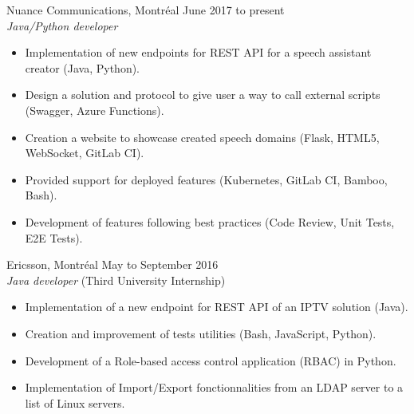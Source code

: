 \documentclass{res}
\newcommand{\inEnglish}[1]{#1}
\begin{document}
\begin{resume}
{	%

}

\inEnglish{
	Nuance Communications, Montréal\footnotemark
	\hfill June 2017 to present \\
	{\sl Java/Python developer}
	\vspace{0.05in}

	\begin{itemize} \itemsep -2pt
		\item Implementation of new endpoints for REST API for a speech assistant creator (Java, Python).
		\item Design a solution and protocol to give user a way to call external scripts (Swagger, Azure Functions).
		\item Creation a website to showcase created speech domains (Flask, HTML5, WebSocket, GitLab CI).
		\item Provided support for deployed features (Kubernetes, GitLab CI, Bamboo, Bash).
             \item Development of features following best practices (Code Review, Unit Tests, E2E Tests).
 
	\end{itemize}

	Ericsson, Montréal\footnotemark
	\hfill May to September 2016 \\
	{\sl Java developer} \hfill (Third University Internship)
	\vspace{0.05in}

	\begin{itemize} \itemsep -2pt
		\item Implementation of a new endpoint for REST API of an IPTV solution (Java).
		\item Creation and improvement of tests utilities (Bash, JavaScript, Python).
		\item Development of a Role-based access control application (RBAC) in Python.
		\item Implementation of Import/Export fonctionnalities from an LDAP server to a list of Linux servers.
	\end{itemize}

}
\end{resume}
\end{document}
